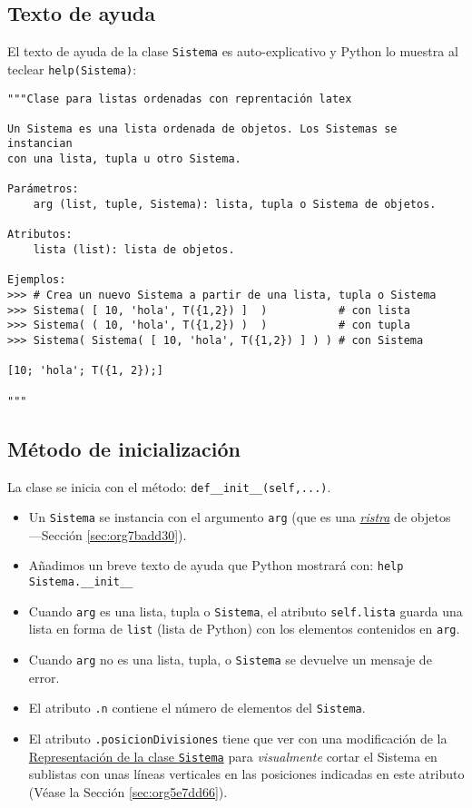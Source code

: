 \documentclass[11pt]{report}
\begin{document}
\subsection{Texto de ayuda}
\label{sec:org9cb59ef}

El texto de ayuda de la clase \texttt{Sistema} es auto-explicativo y Python
lo muestra al teclear \texttt{help(Sistema)}:

\begin{verbatim}
"""Clase para listas ordenadas con reprentación latex

Un Sistema es una lista ordenada de objetos. Los Sistemas se instancian
con una lista, tupla u otro Sistema. 

Parámetros:
    arg (list, tuple, Sistema): lista, tupla o Sistema de objetos.

Atributos:
    lista (list): lista de objetos.

Ejemplos:
>>> # Crea un nuevo Sistema a partir de una lista, tupla o Sistema
>>> Sistema( [ 10, 'hola', T({1,2}) ]  )           # con lista
>>> Sistema( ( 10, 'hola', T({1,2}) )  )           # con tupla
>>> Sistema( Sistema( [ 10, 'hola', T({1,2}) ] ) ) # con Sistema

[10; 'hola'; T({1, 2});]

"""
\end{verbatim}

\subsection{Método de inicialización}
\label{sec:orgc9d45d1}

La clase se inicia con el método: \texttt{def\_\_init\_\_(self,...)}.

\begin{itemize}
\item Un \texttt{Sistema} se instancia con el argumento \texttt{arg} (que es una
\hyperref[sec:org7badd30]{\emph{ristra}} de objetos ---Sección \ref{sec:org7badd30}).

\item Añadimos un breve texto de ayuda que Python mostrará con: \texttt{help Sistema.\_\_init\_\_}

\item Cuando \texttt{arg} es una lista, tupla o \texttt{Sistema}, el atributo \texttt{self.lista}
guarda una lista en forma de \texttt{list} (lista de Python) con los
elementos contenidos en \texttt{arg}.

\item Cuando \texttt{arg} no es una lista, tupla, o \texttt{Sistema} se devuelve un
mensaje de error.

\item El atributo \texttt{.n} contiene el número de elementos del \texttt{Sistema}.

\item El atributo \texttt{.posicionDivisiones} tiene que ver con una modificación
de la \hyperref[sec:org5e7dd66]{Representación de la clase \texttt{Sistema}} para \emph{visualmente} cortar
el Sistema en sublistas con unas líneas verticales en las posiciones
indicadas en este atributo (Véase la Sección \ref{sec:org5e7dd66}).
\end{itemize}
\end{document}
